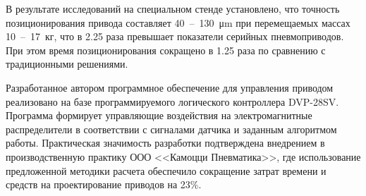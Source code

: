 В результате исследований на специальном стенде установлено, что точность
позиционирования привода составляет \num{40}~--~\num{130}~\si{\micro\metre} при перемещаемых массах
\num{10}~--~\num{17}~кг,
что в \num{2.25} раза превышает показатели серийных пневмоприводов. При этом время
позиционирования сокращено в \num{1.25} раза по сравнению с традиционными решениями.

Разработанное автором программное обеспечение для управления приводом реализовано
на базе программируемого логического контроллера DVP-28SV. Программа формирует
управляющие воздействия на электромагнитные распределители в соответствии с
сигналами датчика и заданным алгоритмом работы. Практическая значимость разработки
подтверждена внедрением в производственную практику ООО <<Камоцци Пневматика>>, где
использование предложенной методики расчета обеспечило сокращение затрат времени и
средств на проектирование приводов на 23\%.





